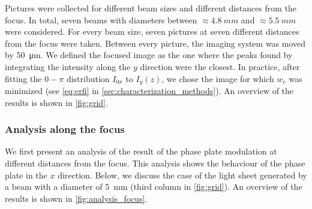Pictures were collected for different beam sizes and different distances from the focus. In total, seven beams with diameters between $\approx\SI{4.8}{mm}$ and $\approx\SI{5.5}{mm}$ were considered. For every beam size, seven pictures at seven different distances from the focus were taken. Between every picture, the imaging system was moved by \SI{50}{\micro m}. We defined the focused image as the one where the peaks found by integrating the intensity along the $y$ direction were the closest. In practice, after fitting the $0-\pi$ distribution $I_{0\pi}$ to $I_y(z)$, we chose the image for which $w_e$ was minimized (see \cref{eq:erfi} in \cref{sec:characterization_methods}). An overview of the results is shown in \cref{fig:grid}.

\subsubsection{Analysis along the focus}
We first present an analysis of the result of the phase plate modulation at different distances from the focus. This analysis shows the behaviour of the phase plate in the $x$ direction. Below, we discuss the case of the light sheet generated by a beam with a diameter of \SI{5}{mm} (third column in \cref{fig:grid}). An overview of the results is shown in \cref{fig:analysis_focus}.

